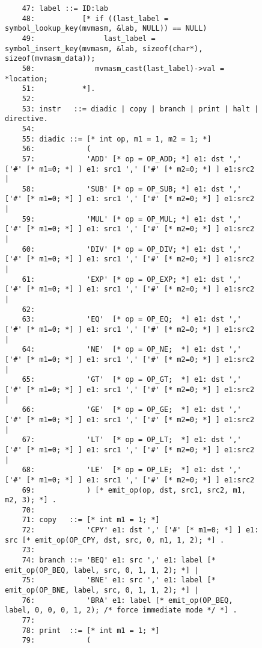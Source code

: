 \begin{figure}
\hspace*{-3.5cm}
\begin{minipage}{30cm}
\footnotesize
\begin{verbatim}
    47: label ::= ID:lab
    48:           [* if ((last_label = symbol_lookup_key(mvmasm, &lab, NULL)) == NULL)
    49:                last_label = symbol_insert_key(mvmasm, &lab, sizeof(char*), sizeof(mvmasm_data));
    50:              mvmasm_cast(last_label)->val = *location;
    51:           *].
    52: 
    53: instr   ::= diadic | copy | branch | print | halt | directive.
    54: 
    55: diadic ::= [* int op, m1 = 1, m2 = 1; *]
    56:            (
    57:            'ADD' [* op = OP_ADD; *] e1: dst ',' ['#' [* m1=0; *] ] e1: src1 ',' ['#' [* m2=0; *] ] e1:src2 |
    58:            'SUB' [* op = OP_SUB; *] e1: dst ',' ['#' [* m1=0; *] ] e1: src1 ',' ['#' [* m2=0; *] ] e1:src2 |
    59:            'MUL' [* op = OP_MUL; *] e1: dst ',' ['#' [* m1=0; *] ] e1: src1 ',' ['#' [* m2=0; *] ] e1:src2 |
    60:            'DIV' [* op = OP_DIV; *] e1: dst ',' ['#' [* m1=0; *] ] e1: src1 ',' ['#' [* m2=0; *] ] e1:src2 |
    61:            'EXP' [* op = OP_EXP; *] e1: dst ',' ['#' [* m1=0; *] ] e1: src1 ',' ['#' [* m2=0; *] ] e1:src2 |
    62: 
    63:            'EQ'  [* op = OP_EQ;  *] e1: dst ',' ['#' [* m1=0; *] ] e1: src1 ',' ['#' [* m2=0; *] ] e1:src2 |
    64:            'NE'  [* op = OP_NE;  *] e1: dst ',' ['#' [* m1=0; *] ] e1: src1 ',' ['#' [* m2=0; *] ] e1:src2 |
    65:            'GT'  [* op = OP_GT;  *] e1: dst ',' ['#' [* m1=0; *] ] e1: src1 ',' ['#' [* m2=0; *] ] e1:src2 |
    66:            'GE'  [* op = OP_GE;  *] e1: dst ',' ['#' [* m1=0; *] ] e1: src1 ',' ['#' [* m2=0; *] ] e1:src2 |
    67:            'LT'  [* op = OP_LT;  *] e1: dst ',' ['#' [* m1=0; *] ] e1: src1 ',' ['#' [* m2=0; *] ] e1:src2 |
    68:            'LE'  [* op = OP_LE;  *] e1: dst ',' ['#' [* m1=0; *] ] e1: src1 ',' ['#' [* m2=0; *] ] e1:src2 
    69:            ) [* emit_op(op, dst, src1, src2, m1, m2, 3); *] .
    70: 
    71: copy   ::= [* int m1 = 1; *]
    72:            'CPY' e1: dst ',' ['#' [* m1=0; *] ] e1: src [* emit_op(OP_CPY, dst, src, 0, m1, 1, 2); *] .
    73: 
    74: branch ::= 'BEQ' e1: src ',' e1: label [* emit_op(OP_BEQ, label, src, 0, 1, 1, 2); *] |
    75:            'BNE' e1: src ',' e1: label [* emit_op(OP_BNE, label, src, 0, 1, 1, 2); *] |
    76:            'BRA' e1: label [* emit_op(OP_BEQ, label, 0, 0, 0, 1, 2); /* force immediate mode */ *] .
    77: 
    78: print  ::= [* int m1 = 1; *]
    79:            (

\end{verbatim}
\end{minipage}
\end{figure}
